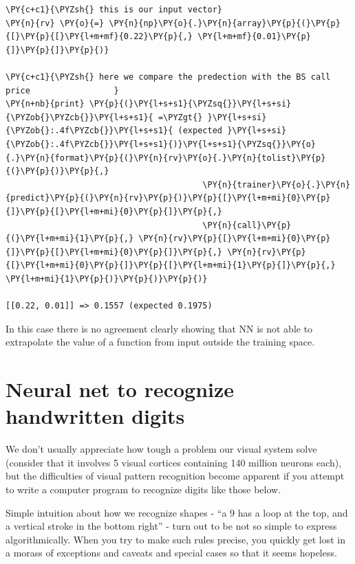     \begin{tcolorbox}[breakable, size=fbox, boxrule=1pt, pad at break*=1mm,colback=cellbackground, colframe=cellborder]
\begin{Verbatim}[commandchars=\\\{\}]
\PY{c+c1}{\PYZsh{} this is our input vector}
\PY{n}{rv} \PY{o}{=} \PY{n}{np}\PY{o}{.}\PY{n}{array}\PY{p}{(}\PY{p}{[}\PY{p}{[}\PY{l+m+mf}{0.22}\PY{p}{,} \PY{l+m+mf}{0.01}\PY{p}{]}\PY{p}{]}\PY{p}{)}
                 
\PY{c+c1}{\PYZsh{} here we compare the predection with the BS call price                 }
\PY{n+nb}{print} \PY{p}{(}\PY{l+s+s1}{\PYZsq{}}\PY{l+s+si}{\PYZob{}\PYZcb{}}\PY{l+s+s1}{ =\PYZgt{} }\PY{l+s+si}{\PYZob{}:.4f\PYZcb{}}\PY{l+s+s1}{ (expected }\PY{l+s+si}{\PYZob{}:.4f\PYZcb{}}\PY{l+s+s1}{)}\PY{l+s+s1}{\PYZsq{}}\PY{o}{.}\PY{n}{format}\PY{p}{(}\PY{n}{rv}\PY{o}{.}\PY{n}{tolist}\PY{p}{(}\PY{p}{)}\PY{p}{,} 
                                        \PY{n}{trainer}\PY{o}{.}\PY{n}{predict}\PY{p}{(}\PY{n}{rv}\PY{p}{)}\PY{p}{[}\PY{l+m+mi}{0}\PY{p}{]}\PY{p}{[}\PY{l+m+mi}{0}\PY{p}{]}\PY{p}{,} 
                                        \PY{n}{call}\PY{p}{(}\PY{l+m+mi}{1}\PY{p}{,} \PY{n}{rv}\PY{p}{[}\PY{l+m+mi}{0}\PY{p}{]}\PY{p}{[}\PY{l+m+mi}{0}\PY{p}{]}\PY{p}{,} \PY{n}{rv}\PY{p}{[}\PY{l+m+mi}{0}\PY{p}{]}\PY{p}{[}\PY{l+m+mi}{1}\PY{p}{]}\PY{p}{,} \PY{l+m+mi}{1}\PY{p}{)}\PY{p}{)}\PY{p}{)}

[[0.22, 0.01]] => 0.1557 (expected 0.1975)
    \end{Verbatim}
\end{tcolorbox}

    In this case there is no agreement clearly showing that NN is not able
to extrapolate the value of a function from input outside the training
space.

\section{Neural net to recognize handwritten
digits}\label{neural-net-to-recognize-handwritten-digits}

We don't usually appreciate how tough a problem our visual system solve
(consider that it involves 5 visual cortices containing 140 million
neurons each), but the difficulties of visual pattern recognition become
apparent if you attempt to write a computer program to recognize digits
like those below.

Simple intuition about how we recognize shapes - ``a 9 has a loop at the
top, and a vertical stroke in the bottom right'' - turn out to be not so
simple to express algorithmically. When you try to make such rules
precise, you quickly get lost in a morass of exceptions and caveats and
special cases so that it seems hopeless.

